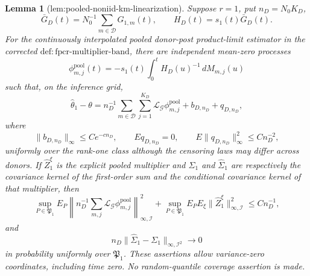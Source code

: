 \documentclass{article}
\newtheorem{lemma}{Lemma}
\begin{document}
\begin{lemma}[lem:pooled-noniid-km-linearization]\label{lem:pooled-noniid-km-linearization}
Suppose \(r=1\), put \(n_D=N_0K_D\),
\[
 \bar G_D(t)=N_0^{-1}\sum_{m\in\mathcal D}G_{1,m}(t),
 \qquad H_D(t)=s_1(t)\bar G_D(t).
\]
For the continuously interpolated pooled donor-post product-limit estimator in the corrected \(\mathrm{def:fpcr\mbox{-}multiplier\mbox{-}band}\), there are independent mean-zero processes
\[
 \phi_{m,j}^{\mathrm{pool}}(t)
 =-s_1(t)\int_0^tH_D(u)^{-1}\,dM_{m,j}(u)
\]
such that, on the inference grid,
\[
 \widehat\theta_1-\theta
 =n_D^{-1}\sum_{m\in\mathcal D}\sum_{j=1}^{K_D}
 \mathcal L_{\mathcal G}\phi_{m,j}^{\mathrm{pool}}
 +b_{D,n_D}+q_{D,n_D},
\]
where
\[
 \|b_{D,n_D}\|_\infty\le Ce^{-cn_D},
 \qquad Eq_{D,n_D}=0,
 \qquad E\|q_{D,n_D}\|_\infty^2\le Cn_D^{-2},
\]
uniformly over the rank-one class although the censoring laws may differ across donors. If \(\widehat Z_1^\xi\) is the explicit pooled multiplier and \(\Sigma_1\) and \(\widehat\Sigma_1\) are respectively the covariance kernel of the first-order sum and the conditional covariance kernel of that multiplier, then
\[
 \sup_{P\in\mathfrak P_1}E_P
 \left\|n_D^{-1}\sum_{m,j}
 \mathcal L_{\mathcal G}\phi_{m,j}^{\mathrm{pool}}\right\|_
 {\infty,\mathcal I}^2
 +\sup_{P\in\mathfrak P_1}E_PE_\xi
 \|\widehat Z_1^\xi\|_{\infty,\mathcal I}^2
 \le Cn_D^{-1},
\]
and
\[
 n_D\|\widehat\Sigma_1-\Sigma_1\|_{\infty,\mathcal I^2}
 \longrightarrow0
\]
in probability uniformly over \(\mathfrak P_1\). These assertions allow variance-zero coordinates, including time zero. No random-quantile coverage assertion is made.
\end{lemma}
\end{document}
